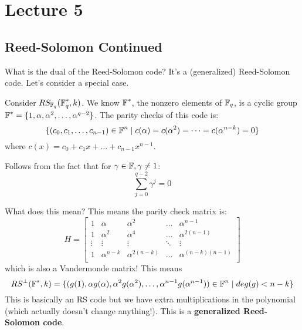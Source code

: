 \section{Lecture 5}

\subsection{Reed-Solomon Continued}
What is the dual of the Reed-Solomon code? It's a (generalized) Reed-Solomon code.
Let's consider a special case.
\begin{theorem}
    Consider $RS_{\operatorname{\mathbb{F}}_q}(\operatorname{\mathbb{F}}_q^*, k)$. We know $\operatorname{\mathbb{F}}^*$, the nonzero elements of $\operatorname{\mathbb{F}}_q$, is a cyclic group
    $\operatorname{\mathbb{F}}^* = \{1, \alpha, \alpha^2, \dots, \alpha^{q-2}\}$. The parity checks of this code is:
    \[ \{(c_0, c_1, \dots, c_{n - 1}) \in \operatorname{\mathbb{F}}^n \mid c(\alpha) = c(\alpha^2) = \dots = c(\alpha^{n - k}) = 0 \} \]
    where $c(x) = c_0 + c_1 x + \dots + c_{n - 1}x^{n - 1}$.

    \begin{proof*}
    Follows from the fact that for $\gamma \in \operatorname{\mathbb{F}}, \gamma \neq 1$:
    \[ \sum_{j = 0}^{q - 2} \gamma^j = 0 \]
    \end{proof*}
\end{theorem}
What does this mean? This means the parity check matrix is:
\[ H = \begin{bmatrix}
    1 & \alpha & \alpha^2 & \dots & \alpha^{n - 1} \\
    1 & \alpha^2 & \alpha^4 & \dots & \alpha^{2(n - 1)} \\
    \vdots & \vdots & \vdots & \ddots & \vdots \\
    1 & \alpha^{n - k} & \alpha^{2(n - k)} & \dots & \alpha^{(n - k)(n - 1)} \\
\end{bmatrix} \]
which is also a Vandermonde matrix! This means
\[ RS^{\perp}(\operatorname{\mathbb{F}}^*, k) = \{(g(1), \alpha g(\alpha), \alpha^2 g(\alpha^2), \dots, \alpha^{n - 1} g(\alpha^{n - 1})) \in \operatorname{\mathbb{F}}^n \mid deg(g) < n - k \} \]
This is basically an RS code but we have extra multiplications in the polynomial (which actually doesn't change anything!). This is a \textbf{generalized Reed-Solomon code}.

